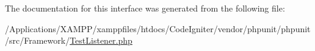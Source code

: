 The documentation for this interface was generated from the following file\+:\begin{DoxyCompactItemize}
\item 
/\+Applications/\+X\+A\+M\+P\+P/xamppfiles/htdocs/\+Code\+Igniter/vendor/phpunit/phpunit/src/\+Framework/\mbox{\hyperlink{_framework_2_test_listener_8php}{Test\+Listener.\+php}}\end{DoxyCompactItemize}
